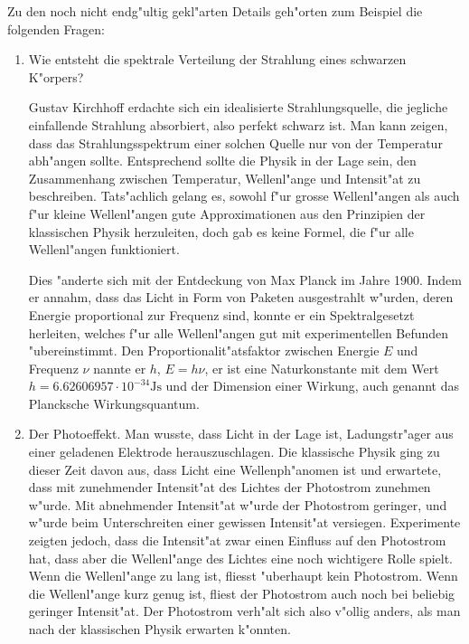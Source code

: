 Zu den noch nicht endg"ultig gekl"arten Details geh"orten
zum Beispiel die folgenden Fragen:
\begin{enumerate}
\item Wie entsteht die spektrale Verteilung der Strahlung eines
schwarzen K"orpers? 

Gustav Kirchhoff erdachte sich ein idealisierte Strahlungsquelle, 
die jegliche einfallende Strahlung absorbiert, also perfekt schwarz
ist. Man kann zeigen, dass das Strahlungsspektrum einer solchen Quelle
nur von der Temperatur abh"angen sollte. Entsprechend sollte die Physik
in der Lage sein, den Zusammenhang zwischen Temperatur, Wellenl"ange
und Intensit"at zu beschreiben. Tats"achlich gelang es, sowohl f"ur 
grosse Wellenl"angen als auch f"ur kleine Wellenl"angen gute Approximationen
aus den Prinzipien der klassischen Physik herzuleiten, doch gab es keine
Formel, die f"ur alle Wellenl"angen funktioniert.

Dies "anderte sich mit der Entdeckung von Max Planck im Jahre 1900.
Indem er annahm, dass das Licht in Form von Paketen ausgestrahlt w"urden,
deren Energie proportional zur Frequenz sind, konnte er ein Spektralgesetzt
herleiten, welches f"ur alle Wellenl"angen gut mit experimentellen
Befunden "ubereinstimmt. Den Proportionalit"atsfaktor zwischen Energie $E$
und Frequenz $\nu$ nannte er $h$, $E=h\nu$, er ist eine Naturkonstante
mit dem Wert $h=6.62606957\cdot 10^{-34}\text{Js}$ und der Dimension
einer Wirkung, auch genannt das Plancksche Wirkungsquantum.

\item
{}
Der Photoeffekt. Man wusste, dass Licht in der
Lage ist, Ladungstr"ager aus einer geladenen Elektrode herauszuschlagen.
Die klassische Physik ging zu dieser Zeit davon aus, dass Licht
eine Wellenph"anomen ist und erwartete, dass mit zunehmender Intensit"at des
Lichtes der Photostrom zunehmen w"urde.
Mit abnehmender Intensit"at w"urde der Photostrom geringer, und w"urde
beim Unterschreiten einer gewissen Intensit"at versiegen.
Experimente zeigten jedoch, dass die
Intensit"at zwar einen Einfluss auf den Photostrom hat, dass aber
die Wellenl"ange des Lichtes eine noch wichtigere Rolle spielt.
Wenn die Wellenl"ange zu lang ist, fliesst "uberhaupt kein Photostrom.
Wenn die Wellenl"ange kurz genug ist, fliest der Photostrom auch noch
bei beliebig geringer Intensit"at.
Der Photostrom verh"alt sich also v"ollig anders, als man nach der
klassischen Physik erwarten k"onnten.


\end{enumerate}
